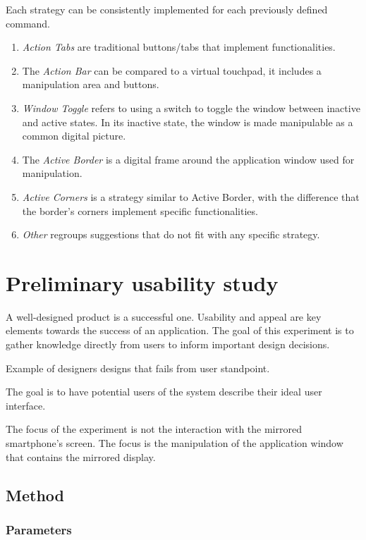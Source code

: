 Each strategy can be consistently implemented for each previously defined command.

\begin{enumerate}
\item{\emph{Action Tabs} are traditional buttons/tabs that implement functionalities.}
\item{The \emph{Action Bar} can be compared to a virtual touchpad, it includes a manipulation area and buttons.}
\item{\emph{Window Toggle} refers to using a switch to toggle the window between inactive and active states. In its inactive state, the window is made manipulable as a common digital picture.}
\item{The \emph{Active Border} is a digital frame around the application window used for manipulation.}
\item{\emph{Active Corners} is a strategy similar to Active Border, with the difference that the border's corners implement specific functionalities.}
\item{\emph{Other} regroups suggestions that do not fit with any specific strategy.}
\end{enumerate}

\section{Preliminary usability study}

A well-designed product is a successful one.
Usability and appeal are key elements towards the success of an application.
The goal of this experiment is to gather knowledge directly from users to inform important design decisions.

Example of designers designs that fails from user standpoint.

The goal is to have potential users of the system describe their ideal user interface.

The focus of the experiment is not the interaction with the mirrored smartphone's screen.
The focus is the manipulation of the application window that contains the mirrored display.

\subsection{Method}	

\subsubsection{Parameters}

